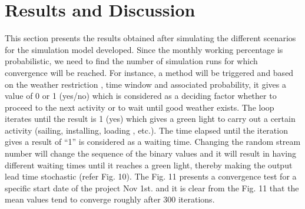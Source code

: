 \section{Results and Discussion}

This section presents the results obtained after simulating the different scenarios for the simulation model developed. Since the monthly working percentage is probabilistic, we need to find the number of simulation runs for which convergence will be reached. For instance, a method will be triggered and based on the weather restriction , time window and associated probability, it gives a value of 0 or 1 (yes/no) which is considered as a deciding factor whether to proceed to the next activity or to wait until good weather exists. The loop iterates until the result is 1 (yes) which gives a green light to carry out a certain activity (sailing, installing, loading , etc.). The time elapsed until the iteration gives a result of “1” is considered as a waiting time. Changing the random stream number will change the sequence of the binary values and it will result in having different waiting times until it reaches a green light, thereby making the output lead time stochastic (refer Fig. 10). The Fig. 11 presents a convergence test for a specific start date of the project Nov 1st. and it is clear from the Fig. 11 that the mean values tend to converge roughly after 300 iterations.